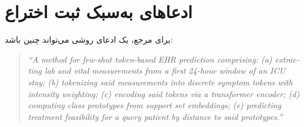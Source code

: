 \section{ادعاهای به‌سبک ثبت اختراع}

برای مرجع، یک ادعای روشی می‌تواند چنین باشد:

\begin{quote}
\begin{latin}
\emph{``A method for few-shot token-based EHR prediction comprising: (a) extracting lab and vital measurements from a first 24-hour window of an ICU stay; (b) tokenizing said measurements into discrete symptom tokens with intensity weighting; (c) encoding said tokens via a transformer encoder; (d) computing class prototypes from support set embeddings; (e) predicting treatment feasibility for a query patient by distance to said prototypes.''}
\end{latin}
\end{quote}
